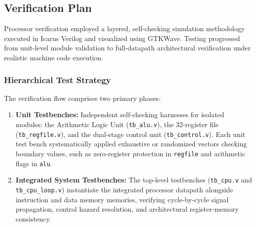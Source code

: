 
\subsection{Verification Plan}
\label{sec:verification}

Processor verification employed a layered, self-checking simulation methodology executed in Icarus Verilog and visualized using GTKWave. Testing progressed from unit-level module validation to full-datapath architectural verification under realistic machine code execution.

\subsubsection{Hierarchical Test Strategy}
The verification flow comprises two primary phases:
\begin{enumerate}
    \item \textbf{Unit Testbenches:} Independent self-checking harnesses for isolated modules: the Arithmetic Logic Unit (\texttt{tb\_alu.v}), the 32-register file (\texttt{tb\_regfile.v}), and the dual-stage control unit (\texttt{tb\_control.v}). Each unit test bench systematically applied exhaustive or randomized vectors checking boundary values, such as zero-register protection in \texttt{regfile} and arithmetic flags in \texttt{alu}.
    \item \textbf{Integrated System Testbenches:} The top-level testbenches (\texttt{tb\_cpu.v} and \texttt{tb\_cpu\_loop.v}) instantiate the integrated processor datapath alongside instruction and data memory memories, verifying cycle-by-cycle signal propagation, control hazard resolution, and architectural register-memory consistency.
\end{enumerate}

